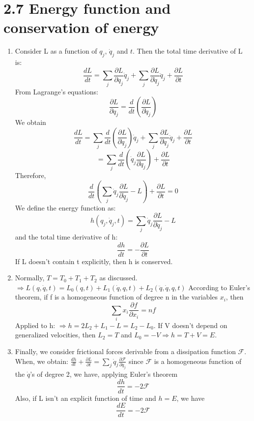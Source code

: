 \documentclass[12pt]{article}
\begin{document}
    \section*{2.7 Energy function and conservation of energy}
    \begin{enumerate}
    	\item Consider L as a function of $q_j$, $\dot{q}_j$ and $t$.
    	Then the total time derivative of L is:
    	$$ \frac{dL}{dt} = \sum_j \frac{\partial L}{\partial q_j} \dot{q}_j + \sum_j \frac{\partial L}{\partial \dot{q}_j} \ddot{q}_j + \frac{\partial L}{\partial t} $$
    	From Lagrange's equations:
    	$$ \frac{\partial L}{\partial q_j} = \frac{d}{dt}\left(\frac{\partial L}{\partial \dot{q}_j}\right) $$
    	We obtain
    	$$ \frac{dL}{dt} = \sum_j \frac{d}{dt}\left(\frac{\partial L}{\partial \dot{q}_j}\right) \dot{q}_j + \sum_j \frac{\partial L}{\partial \dot{q}_j} \ddot{q}_j + \frac{\partial L}{\partial t} $$
    	$$ = \sum_j \frac{d}{dt}\left(\dot{q}_j \frac{\partial L}{\partial \dot{q}_j}\right) + \frac{\partial L}{\partial t} $$
    	Therefore,
    	$$ \frac{d}{dt}\left(\sum_j \dot{q}_j \frac{\partial L}{\partial \dot{q}_j} - L \right) + \frac{\partial L}{\partial t} = 0 $$
    	We define the energy function as:
    	$$ h(q_j, \dot{q}_j, t) = \sum_j \dot{q}_j \frac{\partial L}{\partial \dot{q}_j} - L $$
    	and the total time derivative of h:
    	$$ \frac{dh}{dt} = - \frac{\partial L}{\partial t} $$
    	If L doesn't contain t explicitly, then h is conserved.
    	
    	\item Normally, $T = T_0 + T_1 + T_2$ as discussed.
    	$\Rightarrow L(q, \dot{q}, t) = L_0(q, t) + L_1(\dot{q}, q, t) + L_2(\ddot{q}, \dot{q}, q, t)$
    	According to Euler's theorem, if f is a homogeneous function of degree n in the variables $x_i$, then
    	$$ \sum_i x_i \frac{\partial f}{\partial x_i} = n f $$
    	Applied to h: $\Rightarrow h = 2L_2 + L_1 - L = L_2 - L_0$.
    	If V doesn't depend on generalized velocities, then $L_2 = T$ and $L_0 = -V \Rightarrow h = T + V = E$.
    	
    	\item Finally, we consider frictional forces derivable from a dissipation function $\mathcal{F}$.
    	When, we obtain: $\frac{dh}{dt} + \frac{\partial L}{\partial t} = \sum_j \dot{q}_j \frac{\partial \mathcal{F}}{\partial \dot{q}_j}$
    	since $\mathcal{F}$ is a homogeneous function of the $\dot{q}$'s of degree 2, we have, applying Euler's theorem
    	$$ \frac{dh}{dt} = -2\mathcal{F} $$
    	Also, if L isn't an explicit function of time and $h = E$, we have
    	$$ \frac{dE}{dt} = -2\mathcal{F} $$
    \end{enumerate}
\end{document}
